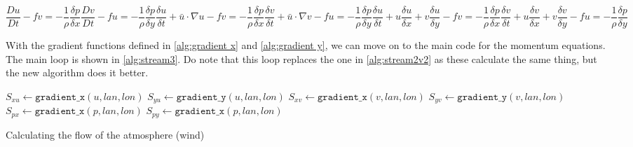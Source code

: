 \begin{subequations}
    \begin{equation}
        \frac{Du}{Dt} - fv = -\frac{1}{\rho} \frac{\delta p}{\delta x}
        \label{eq:x momentum}
    \end{equation}
    \begin{equation}
        \frac{Dv}{Dt} - fu = -\frac{1}{\rho} \frac{\delta p}{\delta y}
        \label{eq:y momentum}
    \end{equation}
    \begin{equation}
        \frac{\delta u}{\delta t} + \bar{u} \cdot \nabla u - fv = -\frac{1}{\rho}\frac{\delta p}{\delta x}
        \label{eq:x momentum laplace}
    \end{equation}
    \begin{equation}
        \frac{\delta v}{\delta t} + \bar{u} \cdot \nabla v - fu = -\frac{1}{\rho}\frac{\delta p}{\delta y}
        \label{eq:y momentum laplace}
    \end{equation}
    \begin{equation}
        \frac{\delta u}{\delta t} + u\frac{\delta u}{\delta x} + v\frac{\delta u}{\delta y} - fv = -\frac{1}{\rho}\frac{\delta p}{\delta x}
        \label{eq:x momentum final}
    \end{equation}
    \begin{equation}
        \frac{\delta v}{\delta t} + u\frac{\delta v}{\delta x} + v\frac{\delta v}{\delta y} - fu = -\frac{1}{\rho}\frac{\delta p}{\delta y}
        \label{eq:y momentum final}
    \end{equation}
\end{subequations}

With the gradient functions defined in \autoref{alg:gradient x} and \autoref{alg:gradient y}, we can move on to the main code for the momentum equations. The main loop is shown in 
\autoref{alg:stream3}. Do note that this loop replaces the one in \autoref{alg:stream2v2} as these calculate the same thing, but the new algorithm does it better.

\begin{algorithm}
    $S_{xu} \leftarrow \texttt{gradient\_x}(u, lan, lon)$ \;
    $S_{yu} \leftarrow \texttt{gradient\_y}(u, lan, lon)$ \;
    $S_{xv} \leftarrow \texttt{gradient\_x}(v, lan, lon)$ \;
    $S_{yv} \leftarrow \texttt{gradient\_y}(v, lan, lon)$ \;
    $S_{px} \leftarrow \texttt{gradient\_x}(p, lan, lon)$ \;
    $S_{py} \leftarrow \texttt{gradient\_x}(p, lan, lon)$ \;
    \caption{Calculating the flow of the atmosphere (wind)}
    \label{alg:stream3}
\end{algorithm}

